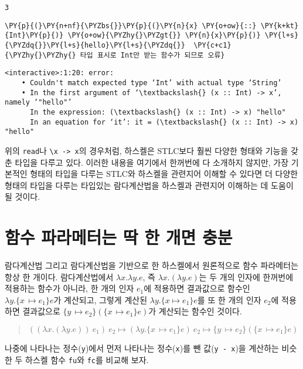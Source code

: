     
    \begin{Verbatim}[commandchars=\\\{\}]
3
    \end{Verbatim}

    
    \begin{tcolorbox}[breakable, size=fbox, boxrule=1pt, pad at break*=1mm,colback=cellbackground, colframe=cellborder, top=.75ex]
\begin{Verbatim}[commandchars=\\\{\}]
\PY{p}{(}\PY{n+nf}{\PYZbs{}}\PY{p}{(}\PY{n}{x} \PY{o+ow}{::} \PY{k+kt}{Int}\PY{p}{)} \PY{o+ow}{\PYZhy{}\PYZgt{}} \PY{n}{x}\PY{p}{)} \PY{l+s}{\PYZdq{}}\PY{l+s}{hello}\PY{l+s}{\PYZdq{}}  \PY{c+c1}{\PYZhy{}\PYZhy{} 타입 표시로 Int만 받는 함수가 되므로 오류}
\end{Verbatim}
\end{tcolorbox}

    \begin{Verbatim}[commandchars=\\\{\}, frame=single, framerule=1mm, rulecolor=\color{outerrorbackground}]
<interactive>:1:20: error:
    • Couldn't match expected type ‘Int’ with actual type ‘String’
    • In the first argument of ‘\textbackslash{} (x :: Int) -> x’, namely ‘"hello"’
      In the expression: (\textbackslash{} (x :: Int) -> x) "hello"
      In an equation for ‘it’: it = (\textbackslash{} (x :: Int) -> x) "hello"
    \end{Verbatim}

    위의 \texttt{read}나 \texttt{\textbackslash{}x\ -\textgreater{}\ x}의
경우처럼, 하스켈은 STLC보다 훨씬 다양한 형태와 기능을 갖춘 타입을 다루고
있다. 이러한 내용을 여기에서 한꺼번에 다 소개하지 않지만, 가장 기본적인
형태의 타입을 다루는 STLC와 하스켈을 관련지어 이해할 수 있다면 더 다양한
형태의 타입을 다루는 타입있는 람다계산법을 하스켈과 관련지어 이해하는 데
도움이 될 것이다.

    \hypertarget{uxd568uxc218-uxd30cuxb77cuxba54uxd130uxb294-uxb531-uxd55c-uxac1cuxba74-uxcda9uxbd84}{%
\section{함수 파라메터는 딱 한 개면
충분}\label{uxd568uxc218-uxd30cuxb77cuxba54uxd130uxb294-uxb531-uxd55c-uxac1cuxba74-uxcda9uxbd84}}

람다계산법 그리고 람다계산법을 기반으로 한 하스켈에서 원론적으로 함수
파라메터는 항상 한 개이다. 람다계산법에서 \(\lambda x.\lambda y.e\), 즉
\(\lambda x.(\lambda y.e)\)는 두 개의 인자에 한꺼번에 적용하는 함수가
아니라, 한 개의 인자 \(e_1\)에 적용하면 결과값으로 함수인
\(\lambda y.\{x{\,\mapsto}e_1\}e\)가 계산되고, 그렇게 계산된
\(\lambda y.\{x{\mapsto}e_1\}e\)를 또 한 개의 인자 \(e_2\)에 적용하면
결과값으로 \(\{y{\,\mapsto}e_2\}(\{x{\,\mapsto}e_1\}e)\)가 계산되는
함수인 것이다.
\begin{quote}
    \(((\lambda x.(\lambda y.e))~e_1)~e_2 \longmapsto (\lambda y.\{x{\,\mapsto}e_1\}e)~e_2 \longmapsto \{y{\,\mapsto}e_2\}(\{x{\,\mapsto}e_1\}e)\)
\end{quote}
    나중에 나타나는 정수(\texttt{y})에서 먼저 나타나는 정수(\texttt{x})를 뺀
값(\texttt{y\ -\ x})을 계산하는 비슷한 두 하스켈 함수 \texttt{fu}와
\texttt{fc}를 비교해 보자.

